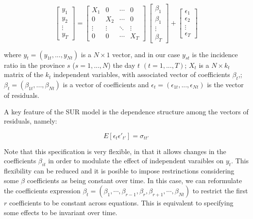 \documentclass[]{elsarticle} %
\begin{document}
\begin{equation}
\label{eq:sur-sim}
\begin{bmatrix}
y_1 \\ y_2 \\ \vdots \\ y_T
\end{bmatrix}
=
  \begin{bmatrix}
X_1 & 0 & \cdots & 0 \\ 0 & X_2 & \cdots & 0 \\ \vdots & \vdots & \ddots & \vdots \\ 0 & 0 & \cdots & X_T
\end{bmatrix}
\
\begin{bmatrix}
\beta_1 \\ \beta_1 \\ \vdots \\ \beta_T
\end{bmatrix}
+
\begin{bmatrix}
\epsilon_1 \\ \epsilon_2 \\ \vdots \\ \epsilon_T
\end{bmatrix}
\end{equation}

\noindent where \(y_{t}=(y_{1t},...,y_{Nt})\) is a \(N \times 1\)
vector, and in our case \(y_{st}\) is the incidence ratio in the
province \(s\) (\(s=1,...,N\)) the day \(t\) \((t=1,...,T)\); \(X_t\) is
a \(N \times k_t\) matrix of the \(k_t\) independent variables, with
associated vector of coefficients \(\beta_t\),;
\(\beta_t=(\beta_{1t},...,\beta_{Nt})\) is a vector of coefficients and
\(\epsilon_t=(\epsilon_{1t},...,\epsilon_{Nt})\) is the vector of
residuals.

A key feature of the SUR model is the dependence structure among the
vectors of residuals, namely:

\begin{equation}
\label{eq:sur-err}
E[\epsilon_t \epsilon'_{t'}]=\sigma_{tt'}
\end{equation}

Note that this specification is very flexible, in that it allows changes
in the coefficients \(\beta_{it}\) in order to modulate the effect of
independent varaibles on \(y_t\). This flexibility can be reduced and it
is posible to impose restrinctions considering some \(\beta\)
coefficients as being constant over time. In this case, we can
reformulate the coefficients expression
\(\beta_t = (\beta_{1}, \cdots, \beta_{r-1}, \beta_{r}, \beta_{r+1}, \cdots, \beta_{Nt})\)
to restrict the first \(r\) coefficients to be constant across
equations. This is equivalent to specifying some effects to be invariant
over time.
\end{document}
